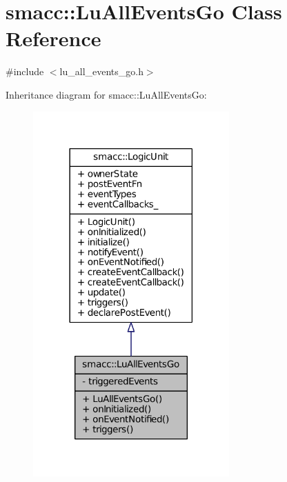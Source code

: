 \hypertarget{classsmacc_1_1LuAllEventsGo}{}\section{smacc\+:\+:Lu\+All\+Events\+Go Class Reference}
\label{classsmacc_1_1LuAllEventsGo}


{\ttfamily \#include $<$lu\+\_\+all\+\_\+events\+\_\+go.\+h$>$}



Inheritance diagram for smacc\+:\+:Lu\+All\+Events\+Go\+:
\nopagebreak
\begin{figure}[H]
\begin{center}
\leavevmode
\includegraphics[width=213pt]{classsmacc_1_1LuAllEventsGo__inherit__graph}
\end{center}
\end{figure}


